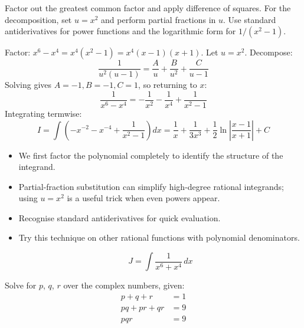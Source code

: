 \vspace{0.5cm}
\begin{hintbox}
Factor out the greatest common factor and apply difference of squares. For the decomposition, set $u=x^2$ and perform partial fractions in $u$. Use standard antiderivatives for power functions and the logarithmic form for $1/(x^2-1)$.
\end{hintbox}

\begin{solution}
Factor: $x^6-x^4=x^4(x^2-1)=x^4(x-1)(x+1)$. Let $u=x^2$. Decompose:
$$
\frac{1}{u^2(u-1)}=\frac{A}{u}+\frac{B}{u^2}+\frac{C}{u-1}
$$
Solving gives $A=-1,B=-1,C=1$, so returning to $x$:
$$
\frac{1}{x^6-x^4} = -\frac{1}{x^2} - \frac{1}{x^4} + \frac{1}{x^2-1}
$$
Integrating termwise:
$$
I = \int\left(-x^{-2}-x^{-4}+\frac{1}{x^2-1}\right)dx = \frac{1}{x}+\frac{1}{3x^3}+\frac{1}{2}\ln\left|\frac{x-1}{x+1}\right| + C
$$
\end{solution}

\begin{takeaways}

\begin{itemize}
    
    \item We first factor the polynomial completely to identify the structure of the integrand.
    \item Partial-fraction substitution can simplify high-degree rational integrands; using $u=x^2$ is a useful trick when even powers appear. 
    \item Recognise standard antiderivatives for quick evaluation.
    \item Try this technique on other rational functions with polynomial denominators. 
    
    $$J = \int \frac{1}{x^6 + x^4} \, dx$$
 \end{itemize}   
\end{takeaways}

\vspace{1cm}

\begin{problem}
Solve for $p$, $q$, $r$ over the complex numbers, given:
$$
\begin{aligned}
p + q + r &= 1 \\
pq + pr + qr &= 9 \\
pqr &= 9
\end{aligned}
$$
\end{problem}

